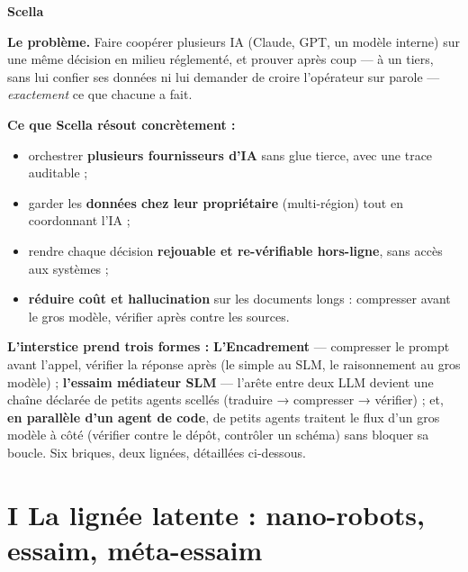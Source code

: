 \documentclass[11pt]{article}
\begin{document}
\begin{center}
{\Huge\bfseries\color{efenavy} Scella}
\end{center}
\vspace{6pt}

\begin{these}
\textbf{Le problème.} Faire coopérer plusieurs IA (Claude, GPT, un modèle interne) sur une même
décision en milieu réglementé, et prouver après coup — à un tiers, sans lui confier ses données ni
lui demander de croire l'opérateur sur parole — \emph{exactement} ce que chacune a fait.

\textbf{Ce que Scella résout concrètement :}
\begin{itemize}[leftmargin=1.3em,itemsep=1.5pt,topsep=2pt,parsep=0pt]
\item orchestrer \textbf{plusieurs fournisseurs d'IA} sans glue tierce, avec une trace auditable ;
\item garder les \textbf{données chez leur propriétaire} (multi-région) tout en coordonnant l'IA ;
\item rendre chaque décision \textbf{rejouable et re-vérifiable hors-ligne}, sans accès aux systèmes ;
\item \textbf{réduire coût et hallucination} sur les documents longs : compresser avant le gros
modèle, vérifier après contre les sources.
\end{itemize}
\vspace{2pt}
\textbf{L'interstice prend trois formes :} \textbf{L'Encadrement} — compresser le prompt avant
l'appel, vérifier la réponse après (le simple au SLM, le raisonnement au gros modèle) ;
\textbf{l'essaim médiateur SLM} — l'arête entre deux LLM devient une chaîne déclarée de petits
agents scellés (traduire → compresser → vérifier) ; et, \textbf{en parallèle d'un agent de code},
de petits agents traitent le flux d'un gros modèle à côté (vérifier contre le dépôt, contrôler un
schéma) sans bloquer sa boucle. Six briques, deux lignées, détaillées ci-dessous.
\end{these}

\section{I \;\textbar\; La lignée latente : nano-robots, essaim, méta-essaim}
\end{document}
